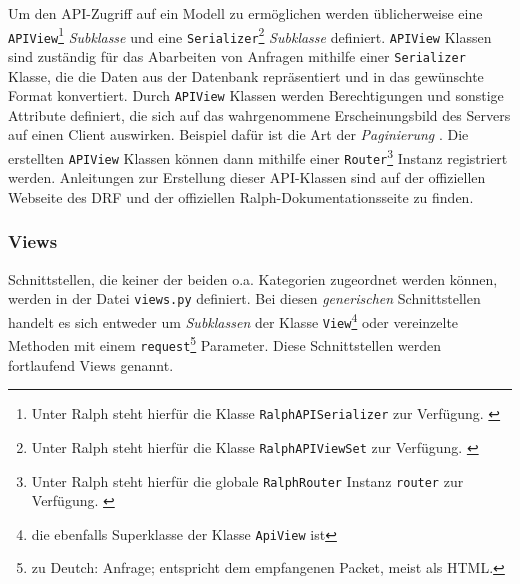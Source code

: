 Um den API-Zugriff auf ein Modell zu ermöglichen werden üblicherweise
eine \texttt{APIView}\footnote{Unter Ralph steht hierfür die Klasse
  \texttt{RalphAPISerializer} zur Verfügung. \cite{ralph-api-doku}}
\emph{Subklasse}
und eine \texttt{Serializer}\footnote{Unter Ralph steht hierfür die
  Klasse \texttt{RalphAPIViewSet} zur Verfügung. \cite{ralph-api-doku}}
\emph{Subklasse}
definiert. \texttt{APIView} Klassen sind zuständig für das Abarbeiten
von Anfragen mithilfe einer \texttt{Serializer} Klasse, die die Daten
aus der Datenbank repräsentiert und in das gewünschte Format
konvertiert. Durch \texttt{APIView} Klassen werden Berechtigungen und
sonstige Attribute definiert, die sich auf das wahrgenommene
Erscheinungsbild des Servers auf einen Client auswirken. Beispiel dafür
ist die Art der \emph{Paginierung}
\cite{django-rest-framework}.
Die erstellten \texttt{APIView} Klassen können dann mithilfe einer
\texttt{Router}\footnote{Unter Ralph steht hierfür die globale
  \texttt{RalphRouter} Instanz \texttt{router} zur Verfügung.
  \cite{ralph-api-doku}} Instanz registriert werden. Anleitungen zur
Erstellung dieser API-Klassen sind auf der offiziellen Webseite des DRF
\cite{django-rest-framework} und der offiziellen
Ralph-Dokumentationsseite \cite{ralph-api-doku} zu finden.

\hypertarget{views}{%
\subsubsection{Views}\label{views}}

Schnittstellen, die keiner der beiden o.a. Kategorien zugeordnet werden
können, werden in der Datei \texttt{views.py} definiert. Bei diesen
\emph{generischen}
Schnittstellen handelt es sich entweder um
\emph{Subklassen}
der Klasse \texttt{View}\footnote{die ebenfalls Superklasse der Klasse
  \texttt{ApiView} ist} \cite{django-doku-class-based-views} oder
vereinzelte Methoden mit einem \texttt{request}\footnote{zu Deutch:
  Anfrage; entspricht dem empfangenen Packet, meist als HTML.}
Parameter. \cite{django-doku-views} Diese Schnittstellen werden
fortlaufend Views genannt.

